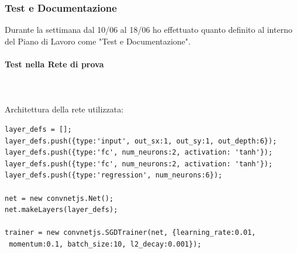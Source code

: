 \subsubsection{Test e Documentazione}
\label{Test e Documentazione}
Durante la settimana dal 10/06 al 18/06 ho effettuato quanto definito al interno del Piano di Lavoro come "Test e Documentazione".

\paragraph{Test nella Rete di prova}\mbox{}\\\\
\label{Test nella Rete di prova}
\noindent
Architettura della rete utilizzata:\\
\begin{verbatim}layer_defs = [];
layer_defs.push({type:'input', out_sx:1, out_sy:1, out_depth:6});
layer_defs.push({type:'fc', num_neurons:2, activation: 'tanh'});
layer_defs.push({type:'fc', num_neurons:2, activation: 'tanh'});
layer_defs.push({type:'regression', num_neurons:6});

net = new convnetjs.Net();
net.makeLayers(layer_defs);

trainer = new convnetjs.SGDTrainer(net, {learning_rate:0.01,
 momentum:0.1, batch_size:10, l2_decay:0.001});
\end{verbatim}
\noindent



